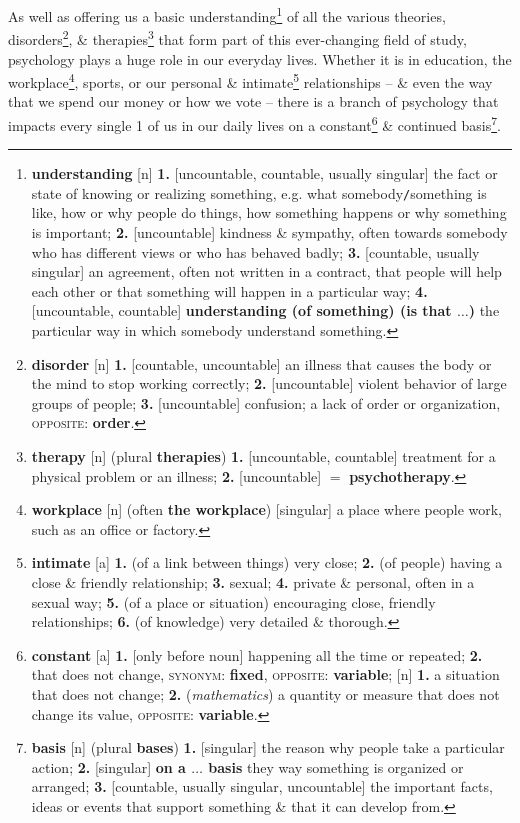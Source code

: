 \documentclass[oneside]{book}
\numberwithin{equation}{section}
\begin{document}
As well as offering us a basic understanding\footnote{\textbf{understanding} [n] \textbf{1.} [uncountable, countable, usually singular] the fact or state of knowing or realizing something, e.g. what somebody\texttt{/}something is like, how or why people do things, how something happens or why something is important; \textbf{2.} [uncountable] kindness \& sympathy, often towards somebody who has different views or who has behaved badly; \textbf{3.} [countable, usually singular] an agreement, often not written in a contract, that people will help each other or that something will happen in a particular way; \textbf{4.} [uncountable, countable] \textbf{understanding (of something) (is that $\ldots$)} the particular way in which somebody understand something.} of all the various theories, disorders\footnote{\textbf{disorder} [n] \textbf{1.} [countable, uncountable] an illness that causes the body or the mind to stop working correctly; \textbf{2.} [uncountable] violent behavior of large groups of people; \textbf{3.} [uncountable] confusion; a lack of order or organization, \textsc{opposite}: \textbf{order}.}, \& therapies\footnote{\textbf{therapy} [n] (plural \textbf{therapies}) \textbf{1.} [uncountable, countable] treatment for a physical problem or an illness; \textbf{2.} [uncountable] $=$ \textbf{psychotherapy}.} that form part of this ever-changing field of study, psychology plays a huge role in our everyday lives. Whether it is in education, the workplace\footnote{\textbf{workplace} [n] (often \textbf{the workplace}) [singular] a place where people work, such as an office or factory.}, sports, or our personal \& intimate\footnote{\textbf{intimate} [a] \textbf{1.} (of a link between things) very close; \textbf{2.} (of people) having a close \& friendly relationship; \textbf{3.} sexual; \textbf{4.} private \& personal, often in a sexual way; \textbf{5.} (of a place or situation) encouraging close, friendly relationships; \textbf{6.} (of knowledge) very detailed \& thorough.} relationships -- \& even the way that we spend our money or how we vote -- there is a branch of psychology that impacts every single 1 of us in our daily lives on a constant\footnote{\textbf{constant} [a] \textbf{1.} [only before noun] happening all the time or repeated; \textbf{2.} that does not change, \textsc{synonym}: \textbf{fixed}, \textsc{opposite}: \textbf{variable}; [n] \textbf{1.} a situation that does not change; \textbf{2.} (\textit{mathematics}) a quantity or measure that does not change its value, \textsc{opposite}: \textbf{variable}.} \& continued basis\footnote{\textbf{basis} [n] (plural \textbf{bases}) \textbf{1.} [singular] the reason why people take a particular action; \textbf{2.} [singular] \textbf{on a $\ldots$ basis} they way something is organized or arranged; \textbf{3.} [countable, usually singular, uncountable] the important facts, ideas or events that support something \& that it can develop from.}. 
\end{document}
